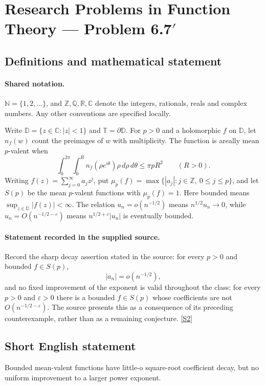 \documentclass[11pt]{article}
\newcommand{\sref}[2]{\hyperlink{source:#1:#2}{[S#2]}}
\begin{document}
\section{Research Problems in Function Theory — Problem 6.7$\prime$}\label{statement}

\subsection{Definitions and mathematical statement}

\paragraph{Shared notation.}$\mathbb N=\{1,2,\ldots\}$, and $\mathbb Z,\mathbb Q,\mathbb R,\mathbb C$ denote the integers, rationals, reals and complex numbers. Any other conventions are specified locally.


Write $\mathbb D=\{z\in\mathbb C:|z|<1\}$ and $\mathbb T=\partial\mathbb D$. For $p>0$ and a holomorphic $f$ on $\mathbb D$, let $n_f(w)$ count the preimages of $w$ with multiplicity. The function is areally mean $p$-valent when
\[\int_0^{2\pi}\int_0^R n_f(\rho e^{i\theta})\rho\,d\rho\,d\theta\leq\pi pR^2\qquad(R>0).\]
Writing $f(z)=\sum_{j=0}^{\infty}a_jz^j$, put $\mu_p(f)=\max\{|a_j|:j\in\mathbb Z,\ 0\leq j\leq p\}$, and let $S(p)$ be the mean $p$-valent functions with $\mu_p(f)=1$.
Here bounded means $\sup_{z\in\mathbb D}|f(z)|<\infty$. The relation $u_n=o(n^{-1/2})$ means $n^{1/2}u_n\to0$, while $u_n=O(n^{-1/2-\varepsilon})$ means $n^{1/2+\varepsilon}|u_n|$ is eventually bounded.
\paragraph{Statement recorded in the supplied source.}
Record the sharp decay assertion stated in the source: for every $p>0$ and bounded $f\in S(p)$,
\[|a_n|=o(n^{-1/2}),\]
and no fixed improvement of the exponent is valid throughout the class: for every $p>0$ and $\varepsilon>0$ there is a bounded $f\in S(p)$ whose coefficients are not $O(n^{-1/2-\varepsilon})$. The source presents this as a consequence of its preceding counterexample, rather than as a remaining conjecture. \sref{statement}{2}
\subsection{Short English statement}
Bounded mean-valent functions have little-o square-root coefficient decay, but no uniform improvement to a larger power exponent.
\end{document}
